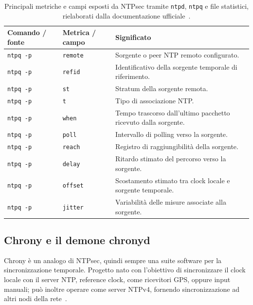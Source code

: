 \begin{table}[H]
  \centering
  \small
  \setlength{\tabcolsep}{4pt}
  \renewcommand{\arraystretch}{1.12}
  \begin{tabularx}{\textwidth}{p{} p{} Y}
    \toprule
    \textbf{Comando / fonte} & \textbf{Metrica / campo} & \textbf{Significato} \\
    \midrule
    \texttt{ntpq -p} & \texttt{remote} & Sorgente o peer NTP remoto configurato. \\
    \texttt{ntpq -p} & \texttt{refid} & Identificativo della sorgente temporale di riferimento. \\
    \texttt{ntpq -p} & \texttt{st} & Stratum della sorgente remota. \\
    \texttt{ntpq -p} & \texttt{t} & Tipo di associazione NTP. \\
    \texttt{ntpq -p} & \texttt{when} & Tempo trascorso dall'ultimo pacchetto ricevuto dalla sorgente. \\
    \texttt{ntpq -p} & \texttt{poll} & Intervallo di polling verso la sorgente. \\
    \texttt{ntpq -p} & \texttt{reach} & Registro di raggiungibilità della sorgente. \\
    \texttt{ntpq -p} & \texttt{delay} & Ritardo stimato del percorso verso la sorgente. \\
    \texttt{ntpq -p} & \texttt{offset} & Scostamento stimato tra clock locale e sorgente temporale. \\
    \texttt{ntpq -p} & \texttt{jitter} & Variabilità delle misure associate alla sorgente. \\
    \bottomrule
  \end{tabularx}
  \caption{Principali metriche e campi esposti da NTPsec tramite \texttt{ntpd}, \texttt{ntpq} e file statistici, rielaborati dalla documentazione ufficiale~\cite{martinNetworkTimeProtocol2010}.}
  \label{tab:ntpsec_metriche}
\end{table}

\subsection{Chrony e il demone chronyd}
\label{Chrony}

Chrony è un analogo di NTPsec, quindi sempre una suite software per la sincronizzazione temporale.
Progetto nato con l'obiettivo di sincronizzare il clock locale con il server NTP,  reference clock, come ricevitori GPS, oppure
input manuali; può inoltre operare come server NTPv4, fornendo sincronizzazione ad
altri nodi della rete~\cite{ChronyDocumentation}.

